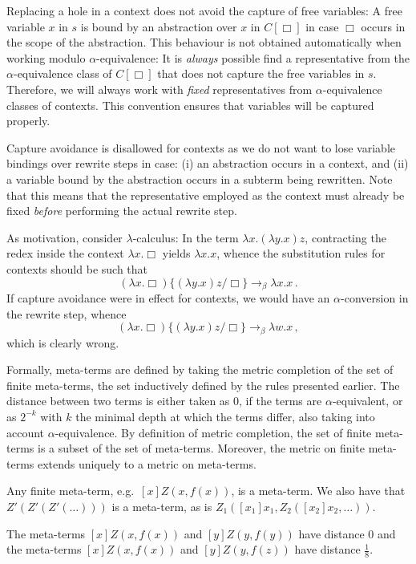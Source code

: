 \documentclass{LMCS}
\theoremstyle{definition}
\newcommand{\rew}{\rightarrow}
\begin{document}
Replacing a hole in a context does not avoid the capture of free variables: A free variable $x$ in $s$ is bound by an abstraction over $x$ in $C[\Box]$ in case $\Box$ occurs in the scope of the abstraction. This behaviour is not obtained automatically when working modulo $\alpha$-equivalence: It is \emph{always} possible find a representative from the $\alpha$-equivalence class of $C[\Box]$ that does not capture the free variables in $s$. Therefore, we will always work with \emph{fixed} representatives from $\alpha$-equivalence classes of contexts. This convention ensures that variables will be captured properly.

\begin{rem}
Capture avoidance is disallowed for contexts as we do not want to lose variable bindings over rewrite steps in case: (i) an abstraction occurs in a context, and (ii) a variable bound by the abstraction occurs in a subterm being rewritten. Note that this means that the representative employed as the context must already be fixed \emph{before} performing the actual rewrite step.

As motivation, consider $\lambda$-calculus: In the term
$\lambda x . (\lambda y . x) z$, contracting the redex 
inside the context $\lambda x . \Box$ yields
$\lambda x.x$, whence the substitution rules for contexts should
be such that 
\[
(\lambda x. \Box)\{(\lambda y . x) z / \Box\}
\rew_\beta \lambda x.x \, .
\]
 If capture avoidance
were in effect for contexts, we would have an $\alpha$-conversion
in the rewrite step, whence
\[
(\lambda x .\Box)\{(\lambda y . x) z / \Box\}
\rew_\beta \lambda w . x \, ,
\]
which is clearly wrong.
\end{rem}

Formally, meta-terms are defined by taking the metric completion of the set of finite meta-terms, the set inductively defined by the rules presented earlier. The distance between two terms is either taken as $0$, if the terms are $\alpha$-equivalent, or as $2^{-k}$ with $k$ the minimal depth at which the terms differ, also taking into account $\alpha$-equivalence. By definition of metric completion, the set of finite meta-terms is a subset of the set of meta-terms. Moreover, the metric on finite meta-terms extends uniquely to a metric on meta-terms.

\begin{exa}
Any finite meta-term, e.g.\ $[x]Z(x,f(x))$, is a meta-term. We also have that $Z'(Z'(Z'(\ldots)))$ is a meta-term, as is $Z_1([x_1]x_1,Z_2([x_2]x_2,\ldots))$.

The meta-terms $[x]Z(x,f(x))$ and $[y]Z(y,f(y))$ have distance $0$ and the meta-terms $[x]Z(x,f(x))$ and $[y]Z(y,f(z))$ have distance $\frac{1}{8}$.
\end{exa}
\end{document}
